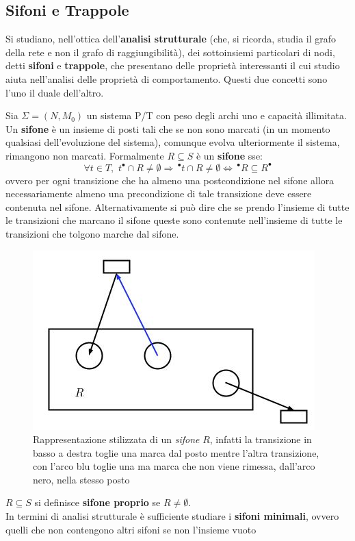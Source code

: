 \documentclass[a4paper,12pt, oneside]{book}
\begin{document}
\subsection{Sifoni e Trappole}
Si studiano, nell'ottica dell'\textbf{analisi strutturale} (che, si ricorda,
studia il grafo della rete e non il grafo di raggiungibilità), dei
sottoinsiemi particolari di nodi, detti \textbf{sifoni} e \textbf{trappole}, che
presentano delle proprietà interessanti il cui studio aiuta nell'analisi delle
proprietà di comportamento. Questi due concetti sono l'uno il duale
dell'altro.
\begin{definizione}
  Sia $\Sigma=(N,M_0)$ un sistema P/T con peso degli archi uno e capacità
  illimitata. \\
  Un \textbf{sifone} è un insieme di posti tali che se non sono marcati (in un
  momento qualsiasi dell'evoluzione del sistema), comunque evolva ulteriormente
  il sistema, rimangono non marcati. Formalmente $R\subseteq S$ è un
  \textbf{sifone} sse: 
  \[\forall t\in T, \,\,t^\bullet \cap R\neq \emptyset\Rightarrow \,^\bullet
    t\cap R\neq \emptyset \Longleftrightarrow \,^\bullet R\subseteq R^\bullet\]
  ovvero per ogni transizione che ha almeno una postcondizione nel sifone allora
  necessariamente almeno una precondizione di tale transizione deve essere
  contenuta nel sifone. Alternativamente si può dire che se prendo l'insieme di
  tutte le transizioni che marcano il sifone queste sono contenute nell'insieme
  di tutte le transizioni che tolgono marche dal sifone.
  \begin{figure}[H]
    \centering
    \includegraphics[scale = 0.45]{img/sif.jpg}
    \caption{Rappresentazione stilizzata di un \emph{sifone} $R$, infatti la
      transizione in basso a destra toglie una marca dal posto mentre l'altra
      transizione, con l'arco blu toglie una ma marca che non viene rimessa,
      dall'arco nero, nella stesso posto}   
  \end{figure}
  $R\subseteq S$ si definisce \textbf{sifone proprio} se $R\neq \emptyset$.\\
  In termini di analisi strutturale è sufficiente studiare i \textbf{sifoni
    minimali}, ovvero quelli che non contengono altri sifoni se non l'insieme
  vuoto 
\end{definizione}
\end{document}
